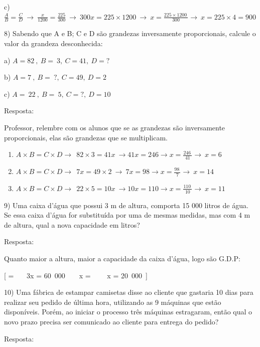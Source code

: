 c)
\(\frac{A}{B} = \frac{C}{D}\  \rightarrow \ \frac{x}{1200} = \frac{225}{300}\  \rightarrow \ 300x = 225 \times 1200\  \rightarrow \ x = \frac{225 \times 1200\ }{300} \rightarrow \ x = 225 \times 4 = 900\)

8) Sabendo que A e B; C e D são grandezas inversamente proporcionais,
calcule o valor da grandeza desconhecida:

a) \(A = 82\ ,\ B = \ 3,\ C = 41,\ D = ?\)

b) \(A = 7\ ,\ B = \ ?,\ C = 49,\ D = 2\)

c) \(A = \ 22\ ,\ B = \ 5,\ C = ?,\ D = 10\)

Resposta:

Professor, relembre com os alunos que se as grandezas são inversamente
proporcionais, elas são grandezas que se multiplicam.

\begin{enumerate}
\def\labelenumi{\alph{enumi})}
\item
  \(A \times B = C \times D \rightarrow \ \ 82 \times 3 = 41x\  \rightarrow 41x = 246 \rightarrow x = \frac{246\ }{41} \rightarrow \ x = 6\)
\item
  \(A \times B = C \times D \rightarrow \ \ 7x = 49 \times 2\  \rightarrow \ 7x = 98 \rightarrow x = \frac{98\ }{7} \rightarrow \ x = 14\)
\item
  \(A \times B = C \times D \rightarrow \ \ 22 \times 5 = 10x\  \rightarrow 10x = 110 \rightarrow x = \frac{110\ }{10} \rightarrow \ x = 11\)
\end{enumerate}

9) Uma caixa d'água que possui 3 m de altura, comporta 15 000 litros de
água. Se essa caixa d'água for substituída por uma de mesmas medidas,
mas com 4 m de altura, qual a nova capacidade em litros?

Resposta:

Quanto maior a altura, maior a capacidade da caixa d'água, logo são
G.D.P:

[ = \  \rightarrow \ \ 3x = 60\ 000\  \rightarrow \ \ \ x = \  \rightarrow \ \ \ x = 20\ 000\ ]

10) Uma fábrica de estampar camisetas disse ao cliente que gastaria 10
dias para realizar seu pedido de última hora, utilizando as 9 máquinas
que estão disponíveis. Porém, ao iniciar o processo três máquinas
estragaram, então qual o novo prazo precisa ser comunicado ao cliente
para entrega do pedido?

Resposta:

